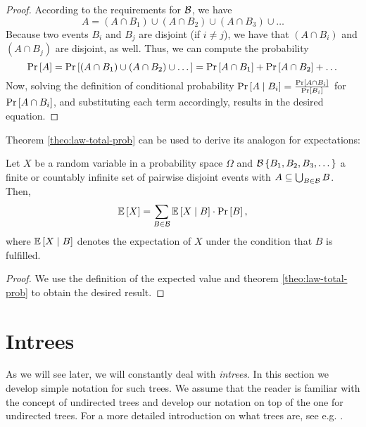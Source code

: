 \begin{proof}
  According to the requirements for ${\cal B}$, we have
  \begin{equation*}
    A = 
    \left( A\cap B_1 \right) \cup
    \left( A\cap B_2 \right) \cup
    \left( A\cap B_3 \right) \cup
    \dots
  \end{equation*}
  Because two events $B_i$ and $B_j$ are disjoint (if $i\neq j$), we have that $\left( A\cap B_i \right)$ and $\left( A\cap B_j \right)$ are disjoint, as well. Thus, we can compute the probability
  \begin{equation*}
    \operatorname{Pr}\left[A\right] = 
    \operatorname{Pr}\left[
      \left( A\cap B_1 \right) \cup
      \left( A\cap B_2 \right) \cup
      \dots
    \right]
    =
    \operatorname{Pr}\left[ A\cap B_1\right] +
    \operatorname{Pr}\left[ A\cap B_2\right] + \dots
  \end{equation*}
  Now, solving the definition of conditional probability $\operatorname{Pr}\left[A\mid B_i\right] = \frac{\operatorname{Pr}\left[A \cap B_i\right]}{\operatorname{Pr}\left[B_i\right]}$ for $\operatorname{Pr}\left[A\cap B_i\right]$, and substituting each term accordingly, results in the desired equation.
\end{proof}

Theorem \ref{theo:law-total-prob} can be used to derive its analogon for expectations:

\begin{theorem}
  \label{theo:law-total-expectation}
  Let $X$ be a random variable in a probability space $\Omega$ and ${\cal B}\left\{ B_1,B_2,B_3,\dots \right\}$ a finite or countably infinite set of pairwise disjoint events with $A \subseteq \bigcup_{B \in {\cal B}} B$. Then,
  \begin{equation*}
    \mathbb{E}\left[ X \right] = \sum_{B\in{\cal B}} \mathbb{E}\left[ X \mid B \right] \cdot \operatorname{Pr}\left[B\right],
  \end{equation*}
  where $\mathbb{E}\left[ X \mid B \right]$ denotes the expectation of $X$ under the condition that $B$ is fulfilled.
\end{theorem}

\begin{proof}
  We use the definition of the expected value and theorem \ref{theo:law-total-prob} to obtain the desired result.
\end{proof}

\section{Intrees}
\label{sec:foundations-graph-theory}

As we will see later, we will constantly deal with \emph{intrees}. In this section we develop simple notation for such trees. We assume that the reader is familiar with the concept of undirected trees and develop our notation on top of the one for undirected trees. For a more detailed introduction on what trees are, see e.g. \cite{diestel2005graph}.

